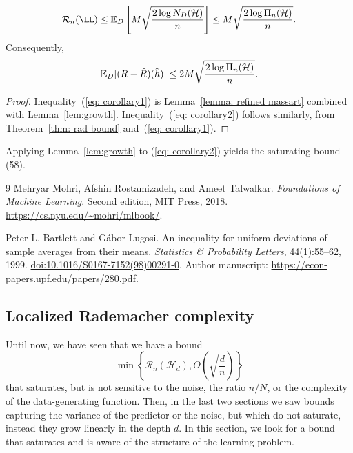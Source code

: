 \documentclass[reqno]{amsart}
\begin{document}
\begin{corollary}\label{cor:growth}
\cite[Section~3.2, Corollary~3.8]{MRT2018}
\begin{equation}\label{eq: corollary1}
 \mathcal R_n(\LL)\le\expv_D\left[M\sqrt{\frac{2\log N_D(\cH)}n}\right]
 \le M\sqrt{\frac{2\log\Pi_{n}(\cH)}n}.
\end{equation}
Consequently,
\begin{equation}\label{eq: corollary2}
 \mathbb{E}_D[(R-\hat R)(\hat h)]\le
 2M\sqrt{\frac{2\log\Pi_{n}(\mathcal{H})}n}.
\end{equation}

\begin{proof}
    Inequality~(\ref{eq: corollary1}) is Lemma~\ref{lemma: refined massart} combined with Lemma~\ref{lem:growth}. Inequality~(\ref{eq: corollary2}) follows similarly, from Theorem~\ref{thm: rad bound} and~(\ref{eq: corollary1}).
\end{proof}
\end{corollary}

Applying Lemma~\ref{lem:growth} to (\ref{eq: corollary2}) yields the saturating bound (58). 

\begin{thebibliography}{9}
Mehryar Mohri, Afshin Rostamizadeh, and Ameet Talwalkar.
\newblock \emph{Foundations of Machine Learning}.
\newblock Second edition, MIT Press, 2018.
\newblock \url{https://cs.nyu.edu/~mohri/mlbook/}.

Peter L. Bartlett and G\'abor Lugosi.
\newblock An inequality for uniform deviations of sample averages from their means.
\newblock \emph{Statistics \& Probability Letters}, 44(1):55--62, 1999.
\newblock \href{https://doi.org/10.1016/S0167-7152(98)00291-0}{doi:10.1016/S0167-7152(98)00291-0}.
\newblock Author manuscript: \url{https://econ-papers.upf.edu/papers/280.pdf}.
\end{thebibliography}

\newpage
\subsection{Localized Rademacher complexity}

Until now, we have seen that we have a bound \[\min \left\{\mathcal R_n(\mathcal H_d), O\left(\sqrt{\frac{d}{n}}\right)\right\}\] that saturates, but is not sensitive to the noise, the ratio $n/N$, or the complexity of the data-generating function. Then, in the last two sections we saw bounds capturing the variance of the predictor or the noise, but which do not saturate, instead they grow linearly in the depth $d$. In this section, we look for a bound that saturates and is aware of the structure of the learning problem.
\end{document}
